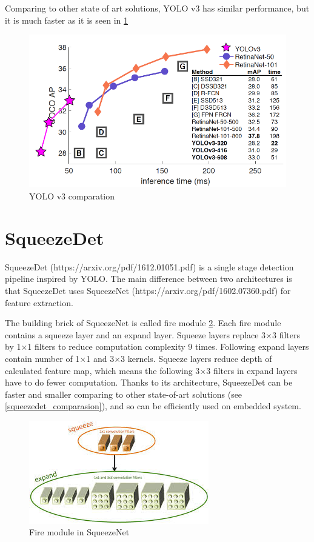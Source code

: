 \documentclass[twoside]{ctuthesis}
\theoremstyle{plain}
\theoremstyle{definition}
\theoremstyle{note}
\begin{document}
Comparing to other state of art solutions, YOLO v3 has similar performance, but it is much faster as it is seen in \ref{yolov3-compare}

\begin{figure}[h]
\caption{YOLO v3 comparation}
\label{yolov3-compare}
\includegraphics[width=\textwidth]{images/used_networks/yolov3_comparasion.png}
\end{figure}
\section{SqueezeDet}

SqueezeDet (https://arxiv.org/pdf/1612.01051.pdf) is a single stage detection pipeline inspired by YOLO. The main difference between two architectures is that SqueezeDet uses SqueezeNet (https://arxiv.org/pdf/1602.07360.pdf) for feature extraction.

The building brick of SqueezeNet is called fire module \ref{fire_squeezenet}. Each fire module contains a squeeze layer and an expand layer. Squeeze layers replace 3$\times$3 filters by 1$\times$1 filters to reduce computation complexity 9 times. Following expand layers contain number of 1$\times$1  and 3$\times$3 kernels.	Squeeze layers reduce depth of calculated feature map, which means the following 3$\times$3 filters in expand layers have to do fewer computation. Thanks to its architecture, SqueezeDet can be faster and smaller comparing to other state-of-art solutions (see \ref{squeezedet_comparasion}), and so can be efficiently used on embedded system. 

\begin{figure}[h]
\caption{Fire module in SqueezeNet}
\label{fire_squeezenet}
\includegraphics[width=.5\textwidth]{images/used_networks/fire_squeezenet.jpeg}
\end{figure}
\end{document}
